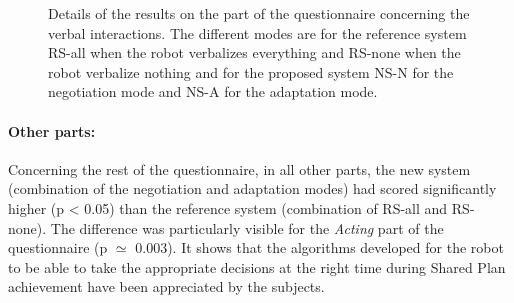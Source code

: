 \documentclass[english,a4paper,11pt,twoside]{StyleThese}
\begin{document}
\begin{figure}[!h]
\centering
    \caption{Details of the results on the part of the questionnaire concerning the verbal interactions. The different modes are for the reference system RS-all when the robot verbalizes everything and RS-none when the robot verbalize nothing and for the proposed system NS-N for the negotiation mode and NS-A for the adaptation mode.}
    \label{fig:resUS}
\end{figure}


\paragraph{Other parts:}
Concerning the rest of the questionnaire, in all other parts, the new system (combination of the negotiation and adaptation modes) had scored significantly higher (p < 0.05) than the reference system (combination of RS-all and RS-none). The difference was particularly visible for the \textit{Acting} part of the questionnaire (p $\simeq$ 0.003). It shows that the algorithms developed for the robot to be able to take the appropriate decisions at the right time during Shared Plan achievement have been appreciated by the subjects.
\end{document}
